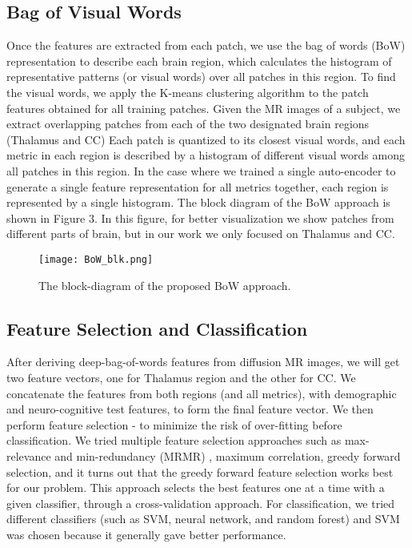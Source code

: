 \documentclass[letterpaper, 10 pt, conference]{ieeeconf}  %
\begin{document}
\subsection{Bag of Visual Words}
Once the features are extracted from each patch, 
we use the bag of words (BoW) representation  \cite{bow1} to describe each brain region, which calculates the histogram of representative patterns (or visual words) over all patches in this region.
To find the visual words, we apply the K-means clustering algorithm to the patch features obtained for all training patches. Given the MR images of a subject, we extract overlapping patches from each of the two designated brain regions (Thalamus and CC) Each patch is quantized to its closest visual words, and each metric in each region is described by a histogram of different visual words among all patches in this region. In the case where we trained a single auto-encoder to generate a single feature representation for all metrics together, each region is represented by a single histogram.
The block diagram of the BoW approach is shown in Figure 3.
In this figure, for better visualization we show patches from different parts of brain, but in our work we only focused on Thalamus and CC.
\begin{figure}[h]
\begin{center}
    \texttt{[image: BoW\_blk.png]}
\end{center}
  \caption{The block-diagram of the proposed BoW approach. }
\end{figure}



\subsection{Feature Selection and Classification}
After deriving deep-bag-of-words features from diffusion MR images, we will get two feature vectors, one for Thalamus region and the other for CC.
We concatenate the features from both regions (and all metrics), with demographic and neuro-cognitive test features, to form the final feature vector.
We then perform feature selection \cite{fs1}-\cite{fs2} to minimize the risk of over-fitting before classification.
We tried multiple feature selection approaches such as max-relevance and min-redundancy (MRMR) \cite{mrmr}, maximum correlation, greedy forward selection, and it turns out that the greedy forward feature selection works best for our problem.
This approach selects the best features one at a time  with a given classifier, through a cross-validation approach. 
For classification, we tried different classifiers (such as SVM, neural network, and random forest) and SVM was chosen because it generally gave better performance.
\end{document}

